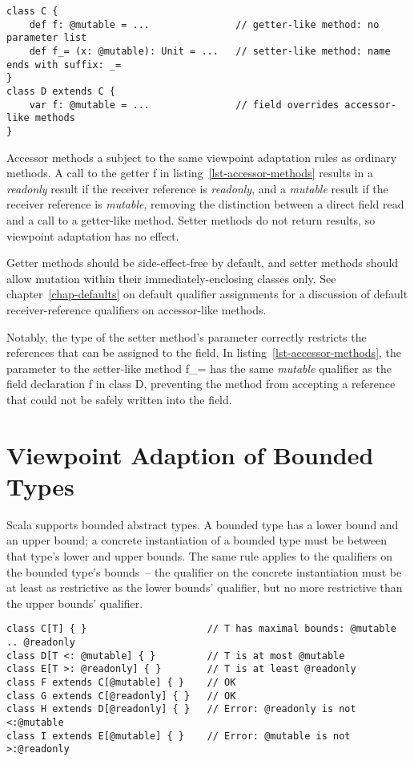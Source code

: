 \begin{lstlisting}[caption={Accessor Methods},float={htp},label={lst-accessor-methods}]
class C {
	def f: @mutable = ...               // getter-like method: no parameter list
	def f_= (x: @mutable): Unit = ...   // setter-like method: name ends with suffix: _=
}
class D extends C {
	var f: @mutable = ...               // field overrides accessor-like methods
}
\end{lstlisting}

Accessor methods a subject to the same viewpoint adaptation rules as ordinary methods.
A call to the getter {\cd f} in listing~\ref{lst-accessor-methods} results in a {\em readonly}
result if the receiver reference is {\em readonly}, and a {\em mutable} result
if the receiver reference is {\em mutable}, removing the distinction between
a direct field read and a call to a getter-like method.
Setter methods do not return results, so viewpoint adaptation has no effect.

Getter methods should be side-effect-free by default, and
setter methods should allow mutation within their immediately-enclosing classes only.
See chapter~\ref{chap-defaults}
on default qualifier assignments for a discussion of default receiver-reference qualifiers
on accessor-like methods.

Notably, the type of the setter method's parameter correctly restricts
the references that can be assigned to the field.
In listing~\ref{lst-accessor-methods}, the parameter to the setter-like method {\cd f\_=}
has the same {\em mutable} qualifier as the field declaration {\cd f} in class {\cd D},
preventing the method from accepting a reference that could not be safely written into
the field.

\section{Viewpoint Adaption of Bounded Types} \label{sec-vp-bounded}

Scala supports bounded abstract types.
A bounded type has a lower bound and an upper bound;
a concrete instantiation of a bounded type must be between that type's lower and upper bounds.
The same rule applies to the qualifiers on the bounded type's bounds~--
the qualifier on the concrete instantiation must be
at least as restrictive as the lower bounds' qualifier, but no more restrictive
than the upper bounds' qualifier.

\begin{lstlisting}[caption={Bounded Type Instantiation},float={htp},label={lst-bounded-inst}]
class C[T] { }                     // T has maximal bounds: @mutable .. @readonly
class D[T <: @mutable] { }         // T is at most @mutable
class E[T >: @readonly] { }        // T is at least @readonly
class F extends C[@mutable] { }    // OK
class G extends C[@readonly] { }   // OK
class H extends D[@readonly] { }   // Error: @readonly is not <:@mutable
class I extends E[@mutable] { }    // Error: @mutable is not >:@readonly
\end{lstlisting}

